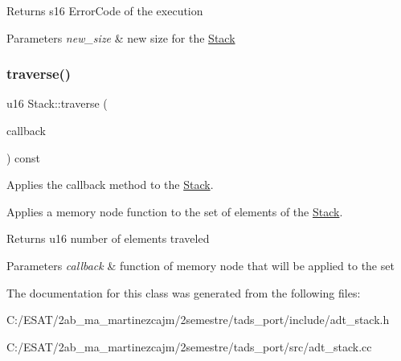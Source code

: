 \begin{DoxyReturn}{Returns}
s16 Error\+Code of the execution 
\end{DoxyReturn}

\begin{DoxyParams}{Parameters}
{\em new\+\_\+size} & new size for the \hyperlink{class_stack}{Stack} \\
\hline
\end{DoxyParams}
\mbox{\label{class_stack_a9b8f6f94beb016e0345e7c5ace28ab94}} 
\subsubsection{\texorpdfstring{traverse()}{traverse()}}
{\footnotesize\ttfamily u16 Stack\+::traverse (\begin{DoxyParamCaption}\item[{s16(Memory\+Node\+::$\ast$)()}]{callback }\end{DoxyParamCaption}) const}



Applies the callback method to the \hyperlink{class_stack}{Stack}. 

Applies a memory node function to the set of elements of the \hyperlink{class_stack}{Stack}.

\begin{DoxyReturn}{Returns}
u16 number of elements traveled 
\end{DoxyReturn}

\begin{DoxyParams}{Parameters}
{\em callback} & function of memory node that will be applied to the set \\
\hline
\end{DoxyParams}


The documentation for this class was generated from the following files\+:\begin{DoxyCompactItemize}
\item 
C\+:/\+E\+S\+A\+T/2ab\+\_\+ma\+\_\+martinezcajm/2semestre/tads\+\_\+port/include/adt\+\_\+stack.\+h\item 
C\+:/\+E\+S\+A\+T/2ab\+\_\+ma\+\_\+martinezcajm/2semestre/tads\+\_\+port/src/adt\+\_\+stack.\+cc\end{DoxyCompactItemize}
